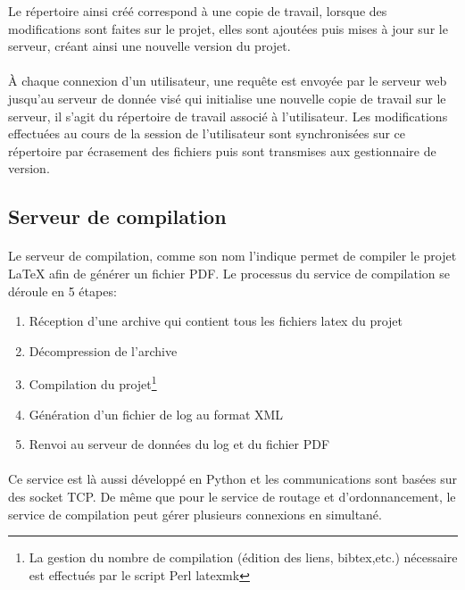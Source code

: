 \documentclass[a4paper,12pt]{article}
\begin{document}
Le répertoire ainsi créé correspond à une copie de travail, lorsque des modifications sont faites sur le projet, elles sont ajoutées puis mises à jour sur le serveur, créant ainsi une nouvelle version du projet.

\paragraph{}
\`A chaque connexion d'un utilisateur, une requête est envoyée par le serveur web jusqu'au serveur de donnée visé qui initialise une nouvelle copie de travail sur le serveur, il s'agit du répertoire de travail associé à l'utilisateur.
Les modifications effectuées au cours de la session de l'utilisateur sont synchronisées sur ce répertoire par écrasement des fichiers puis sont transmises aux gestionnaire de version.

\subsection{Serveur de compilation}
\paragraph*{}
Le serveur de compilation, comme son nom l'indique permet de compiler le projet LaTeX afin de générer un fichier PDF. Le processus du service de compilation se déroule en 5 étapes:
\begin{enumerate}
 \item Réception d'une archive qui contient tous les fichiers latex du projet
 \item Décompression de l'archive
 \item Compilation du projet\footnote{La gestion du nombre de compilation (édition des liens, bibtex,etc.) nécessaire est effectués par le script Perl latexmk}
 \item Génération d'un fichier de log au format XML
 \item Renvoi au serveur de données du log et du fichier PDF
\end{enumerate}

\paragraph*{}
Ce service est là aussi développé en Python et les communications sont basées sur des socket TCP. De même que pour le service de routage et d'ordonnancement, le service de compilation peut gérer plusieurs connexions en simultané.
\end{document}
